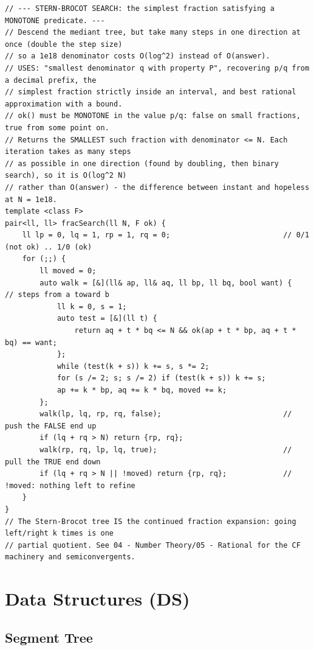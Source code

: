 \documentclass[9pt,a4paper,twocolumn]{extarticle}
\begin{document}
\begin{lstlisting}
// --- STERN-BROCOT SEARCH: the simplest fraction satisfying a MONOTONE predicate. ---
// Descend the mediant tree, but take many steps in one direction at once (double the step size)
// so a 1e18 denominator costs O(log^2) instead of O(answer).
// USES: "smallest denominator q with property P", recovering p/q from a decimal prefix, the
// simplest fraction strictly inside an interval, and best rational approximation with a bound.
// ok() must be MONOTONE in the value p/q: false on small fractions, true from some point on.
// Returns the SMALLEST such fraction with denominator <= N. Each iteration takes as many steps
// as possible in one direction (found by doubling, then binary search), so it is O(log^2 N)
// rather than O(answer) - the difference between instant and hopeless at N = 1e18.
template <class F>
pair<ll, ll> fracSearch(ll N, F ok) {
    ll lp = 0, lq = 1, rp = 1, rq = 0;                          // 0/1 (not ok) .. 1/0 (ok)
    for (;;) {
        ll moved = 0;
        auto walk = [&](ll& ap, ll& aq, ll bp, ll bq, bool want) {   // steps from a toward b
            ll k = 0, s = 1;
            auto test = [&](ll t) {
                return aq + t * bq <= N && ok(ap + t * bp, aq + t * bq) == want;
            };
            while (test(k + s)) k += s, s *= 2;
            for (s /= 2; s; s /= 2) if (test(k + s)) k += s;
            ap += k * bp, aq += k * bq, moved += k;
        };
        walk(lp, lq, rp, rq, false);                            // push the FALSE end up
        if (lq + rq > N) return {rp, rq};
        walk(rp, rq, lp, lq, true);                             // pull the TRUE end down
        if (lq + rq > N || !moved) return {rp, rq};             // !moved: nothing left to refine
    }
}
// The Stern-Brocot tree IS the continued fraction expansion: going left/right k times is one
// partial quotient. See 04 - Number Theory/05 - Rational for the CF machinery and semiconvergents.
\end{lstlisting}

\section{Data Structures (DS)}

\subsection{Segment Tree}

\filbreak
\end{document}

